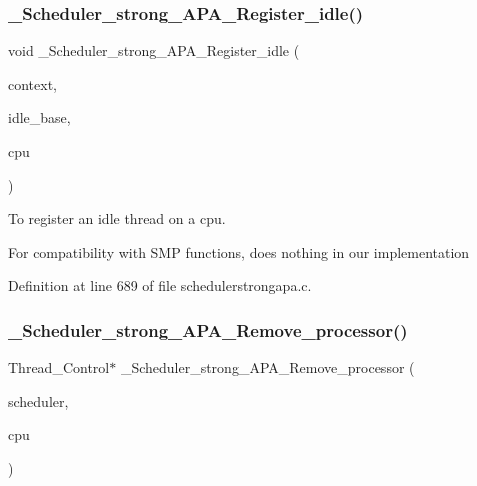 \subsubsection{\texorpdfstring{\+\_\+\+Scheduler\+\_\+strong\+\_\+\+A\+P\+A\+\_\+\+Register\+\_\+idle()}{\_Scheduler\_strong\_APA\_Register\_idle()}}
{\footnotesize\ttfamily void \+\_\+\+Scheduler\+\_\+strong\+\_\+\+A\+P\+A\+\_\+\+Register\+\_\+idle (\begin{DoxyParamCaption}\item[{Scheduler\+\_\+\+Context $\ast$}]{context,  }\item[{Scheduler\+\_\+\+Node $\ast$}]{idle\+\_\+base,  }\item[{Per\+\_\+\+C\+P\+U\+\_\+\+Control $\ast$}]{cpu }\end{DoxyParamCaption})}



To register an idle thread on a cpu. 

For compatibility with S\+MP functions, does nothing in our implementation 

Definition at line 689 of file schedulerstrongapa.\+c.

\mbox{\label{group__RTEMSScoreSchedulerStrongAPA_ga91dc29dcdeea35e3329623be7a798e39}} 
\subsubsection{\texorpdfstring{\+\_\+\+Scheduler\+\_\+strong\+\_\+\+A\+P\+A\+\_\+\+Remove\+\_\+processor()}{\_Scheduler\_strong\_APA\_Remove\_processor()}}
{\footnotesize\ttfamily Thread\+\_\+\+Control$\ast$ \+\_\+\+Scheduler\+\_\+strong\+\_\+\+A\+P\+A\+\_\+\+Remove\+\_\+processor (\begin{DoxyParamCaption}\item[{const Scheduler\+\_\+\+Control $\ast$}]{scheduler,  }\item[{Per\+\_\+\+C\+P\+U\+\_\+\+Control $\ast$}]{cpu }\end{DoxyParamCaption})}



